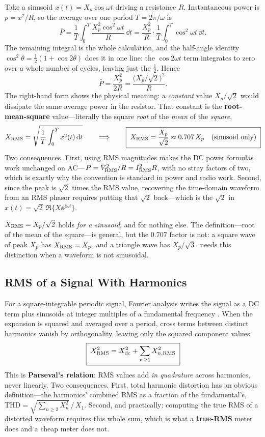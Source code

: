 Take a sinusoid \(x(t)=X_p\cos\omega t\) driving a resistance \(R\). Instantaneous
power is \(p=x^2/R\), so the average over one period \(T=2\pi/\omega\) is
\[
\bar P=\frac{1}{T}\int_0^T\frac{X_p^2\cos^2\omega t}{R}\,\dd t
=\frac{X_p^2}{R}\cdot\frac{1}{T}\int_0^T\cos^2\omega t\,\dd t .
\]
The remaining integral is the whole calculation, and the half-angle identity
\(\cos^2\theta=\tfrac12(1+\cos2\theta)\) does it in one line: the \(\cos2\omega t\)
term integrates to zero over a whole number of cycles, leaving just the \(\tfrac12\).
Hence
\[
\bar P=\frac{X_p^2}{2R}
=\frac{\bigl(X_p/\sqrt2\bigr)^2}{R} .
\]
The right-hand form shows the physical meaning: a \emph{constant} value
\(X_p/\sqrt2\) would dissipate the same average power in the resistor. That constant is the
\textbf{root-mean-square} value---literally the square \emph{root} of the
\emph{mean} of the \emph{square},
\[
X_{\mathrm{RMS}}=\sqrt{\frac{1}{T}\int_0^T x^2(t)\,\mathrm{d} t}
\qquad\Longrightarrow\qquad
\boxed{\;X_{\mathrm{RMS}}=\frac{X_p}{\sqrt2}\approx0.707\,X_p\quad\text{(sinusoid only)}\;}
\]
Two consequences. First, using RMS magnitudes makes the DC power formulas work
unchanged on AC---\(P=V_{\mathrm{RMS}}^2/R=I_{\mathrm{RMS}}^2R\), with no stray factors of two,
which is exactly why the convention is standard in power and radio work. Second,
since the peak is \(\sqrt2\) times the RMS value, recovering the time-domain
waveform from an RMS phasor requires putting that \(\sqrt2\) back---which is the
\(\sqrt2\) in \(x(t)=\sqrt2\,\Re\{X\ee^{\jj\omega t}\}\).

\begin{mistakebox}
\(X_{\mathrm{RMS}}=X_p/\sqrt2\) holds \emph{for a sinusoid}, and for nothing else. The
definition---root of the mean of the square---is general, but the \(0.707\) factor
is not: a square wave of peak \(X_p\) has \(X_{\mathrm{RMS}}=X_p\), and a triangle wave has
\(X_p/\sqrt3\).  needs this distinction when a waveform is not
sinusoidal.
\end{mistakebox}

\subsection{RMS of a Signal With Harmonics}
\label{sec:parseval}
For a square-integrable periodic signal, Fourier analysis writes the signal as a
DC term plus sinusoids at integer multiples of a fundamental frequency
\cite[pp.~9--12]{carr2002components}. When the expansion is squared and averaged
over a period, cross terms between distinct harmonics vanish by orthogonality,
leaving only the squared component values:
\[
\boxed{\;X_{\mathrm{RMS}}^2=X_{\mathrm{dc}}^2+\sum_{n\ge1}X_{n,\mathrm{RMS}}^2\;}
\]
This is \textbf{Parseval's relation}: RMS values add \emph{in quadrature} across
harmonics, never linearly. Two consequences. First, total harmonic distortion has an
obvious definition---the harmonics' combined RMS as a fraction of the fundamental's,
\(\mathrm{THD}=\sqrt{\sum_{n\ge2}X_n^2}\,/\,X_1\). Second, and practically: computing
the true RMS of a distorted waveform requires this whole sum, which is what a
\textbf{true-RMS} meter does and a cheap meter does not.


